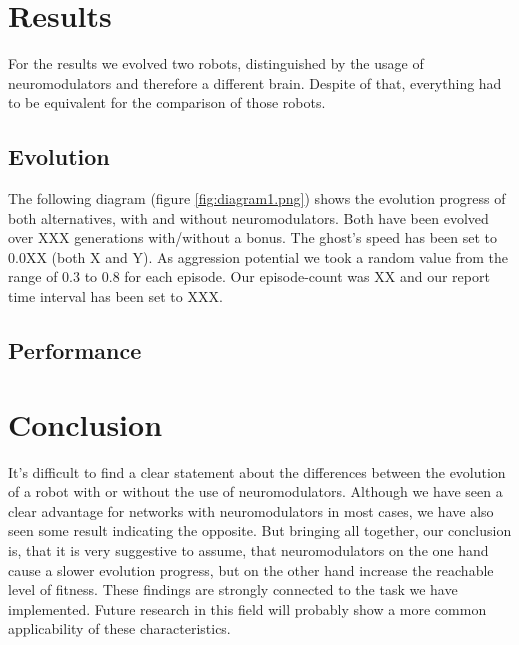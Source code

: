 \documentclass[12pt,fleqn,a4paper]{article}
\begin{document}
\section{Results}
For the results we evolved two robots, distinguished by the usage of neuromodulators and therefore a different brain. Despite of that, everything had to be equivalent for the comparison of those robots.

\subsection{Evolution}
The following diagram (figure \ref{fig:diagram1.png}) shows the evolution progress of both alternatives, with and without neuromodulators. Both have been evolved over XXX generations with/without a bonus. The ghost's speed has been set to 0.0XX (both X and Y). As aggression potential we took a random value from the range of 0.3 to 0.8 for each episode. Our episode-count was XX and our report time interval has been set to XXX. 




\subsection{Performance}


\section{Conclusion}
It's difficult to find a clear statement about the differences between the evolution of a robot with or without the use of neuromodulators. Although we have seen a clear advantage for networks with neuromodulators in most cases, we have also seen some result indicating the opposite. But bringing all together, our conclusion is, that it is very suggestive to assume, that neuromodulators on the one hand cause a slower evolution progress, but on the other hand increase the reachable level of fitness. These findings are strongly connected to the task we have implemented. Future research in this field will probably show a more common applicability of these characteristics.
\end{document}
